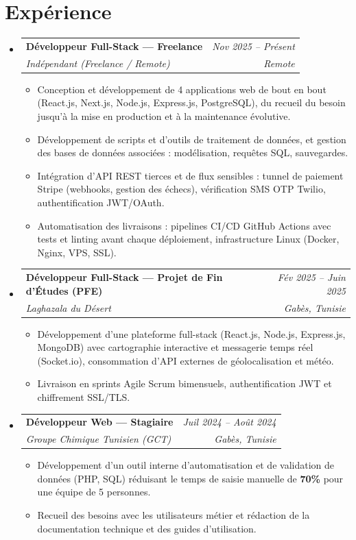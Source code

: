 \documentclass[letterpaper,9pt]{article}
\makeatletter
\newcommand{\resumeItem}[1]{\item\small{#1}}
\newcommand{\resumeSubheading}[4]{
  \vspace{-1pt}\item
  \begin{tabular*}{0.97\textwidth}[t]{l@{\extracolsep{\fill}}r}
    \textbf{#1} & \textit{\color{greytext}#2} \\
    \textit{\small\color{greytext} #3} & \textit{\small\color{greytext} #4}
  \end{tabular*}\vspace{-2pt}
}
\newcommand{\resumeSubHeadingListStart}{\begin{itemize}[leftmargin=0.18in, label={}, itemsep=1.2pt, topsep=2.5pt, parsep=0pt]}
\newcommand{\resumeSubHeadingListEnd}{\end{itemize}\vspace{-2pt}}
\newcommand{\resumeItemListStart}{\begin{itemize}[leftmargin=0.24in, label={}, itemsep=0.9pt, topsep=1.2pt, parsep=0pt]}
\newcommand{\resumeItemListEnd}{\end{itemize}\vspace{-2pt}}
\makeatother
\begin{document}
\section{Expérience}
\resumeSubHeadingListStart

  \resumeSubheading{Développeur Full-Stack --- Freelance}{Nov 2025 -- Présent}{Indépendant (Freelance / Remote)}{Remote}
    \resumeItemListStart
      \resumeItem{Conception et développement de 4 applications web de bout en bout (React.js, Next.js, Node.js, Express.js, PostgreSQL), du recueil du besoin jusqu'à la mise en production et à la maintenance évolutive.}
      \resumeItem{Développement de scripts et d'outils de traitement de données, et gestion des bases de données associées : modélisation, requêtes SQL, sauvegardes.}
      \resumeItem{Intégration d'API REST tierces et de flux sensibles : tunnel de paiement Stripe (webhooks, gestion des échecs), vérification SMS OTP Twilio, authentification JWT/OAuth.}
      \resumeItem{Automatisation des livraisons : pipelines CI/CD GitHub Actions avec tests et linting avant chaque déploiement, infrastructure Linux (Docker, Nginx, VPS, SSL).}
    \resumeItemListEnd

  \resumeSubheading{Développeur Full-Stack --- Projet de Fin d'Études (PFE)}{Fév 2025 -- Juin 2025}{Laghazala du Désert}{Gabès, Tunisie}
    \resumeItemListStart
      \resumeItem{Développement d'une plateforme full-stack (React.js, Node.js, Express.js, MongoDB) avec cartographie interactive et messagerie temps réel (Socket.io), consommation d'API externes de géolocalisation et météo.}
      \resumeItem{Livraison en sprints Agile Scrum bimensuels, authentification JWT et chiffrement SSL/TLS.}
    \resumeItemListEnd

  \resumeSubheading{Développeur Web --- Stagiaire}{Juil 2024 -- Août 2024}{Groupe Chimique Tunisien (GCT)}{Gabès, Tunisie}
    \resumeItemListStart
      \resumeItem{Développement d'un outil interne d'automatisation et de validation de données (PHP, SQL) réduisant le temps de saisie manuelle de \textbf{70\%} pour une équipe de 5 personnes.}
      \resumeItem{Recueil des besoins avec les utilisateurs métier et rédaction de la documentation technique et des guides d'utilisation.}
    \resumeItemListEnd

\resumeSubHeadingListEnd\vspace{-2pt}

\end{document}
